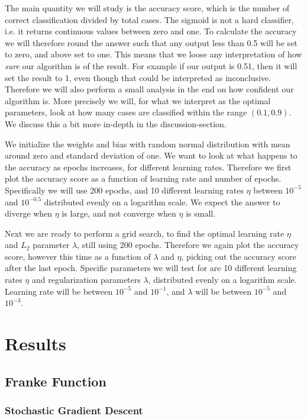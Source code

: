 \documentclass[12pt]{extarticle}
\begin{document}
The main quantity we will study is the accuracy score, which is the number of correct classification divided by total cases. The sigmoid is not a hard classifier, i.e. it returns continuous values between zero and one. To calculate the accuracy we will therefore round the answer such that any output less than 0.5 will be set to zero, and above set to one. This means that we loose any interpretation of how \emph{sure} our algorithm is of the result. For example if our output is 0.51, then it will set the result to 1, even though that could be interpreted as inconclusive. Therefore we will also perform a small analysis in the end on how confident our algorithm is. More precisely we will, for what we interpret as the optimal parameters, look at how many cases are classified within the range $(0.1, 0.9)$. We discuss this a bit more in-depth in the discussion-section.

We initialize the weights and bias with random normal distribution with mean around zero and standard deviation of one. We want to look at what happens to the accuracy as epochs increases, for different learning rates. Therefore we first plot the accuracy score as a function of learning rate and number of epochs. Specifically we will use 200 epochs, and 10 different learning rates $\eta$ between $10^{-5}$ and $10^{-0.5}$ distributed evenly on a logarithm scale. We expect the answer to diverge when $\eta$ is large, and not converge when $\eta$ is small.

Next we are ready to perform a grid search, to find the optimal learning rate $\eta$ and $L_2$ parameter $\lambda$, still using 200 epochs. Therefore we again plot the accuracy score, however this time as a function of $\lambda$ and $\eta$, picking out the accuracy score after the last epoch. Specific parameters we will test for are 10 different learning rates $\eta$ and regularization parameters $\lambda$, distributed evenly on a logarithm scale. Learning rate will be between $10^{-5}$ and $10^{-1}$, and $\lambda$ will be between $10^{-5}$ and $10^{-3}$.

\section{Results}

\subsection{Franke Function}
\subsubsection{Stochastic Gradient Descent}
\end{document}
